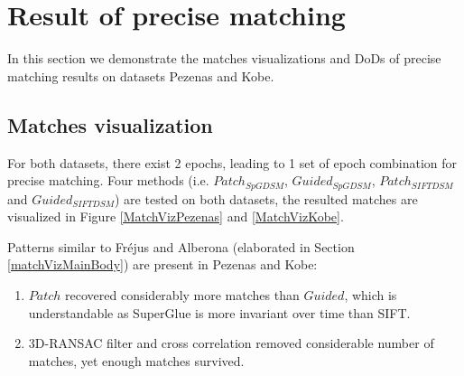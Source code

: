 
\chapter{Result of precise matching}
\label{chap:appendixB}
In this section we demonstrate the matches visualizations and \ac{DoD}s of precise matching results on datasets Pezenas and Kobe.\\

\section{Matches visualization}
\label{sec:PrecisematchViz}
For both datasets, there exist 2 epochs, leading to 1 set of epoch combination for precise matching. Four methods (i.e.  $Patch_{SpGDSM}$,  $Guided_{SpGDSM}$,  $Patch_{SIFTDSM}$ and  $Guided_{SIFTDSM}$) are tested on both datasets, the resulted matches are visualized in Figure \ref{MatchVizPezenas} and \ref{MatchVizKobe}. 



Patterns similar to Fr{\'e}jus and Alberona (elaborated in Section \ref{matchVizMainBody}) are present in Pezenas and Kobe:\\
\begin{enumerate}
	\item $Patch$ recovered considerably more matches than $Guided$, which is understandable as SuperGlue is more invariant over time than SIFT.\\
	\item 3D-RANSAC filter and cross correlation removed considerable number of matches, yet enough matches survived.
\end{enumerate}


